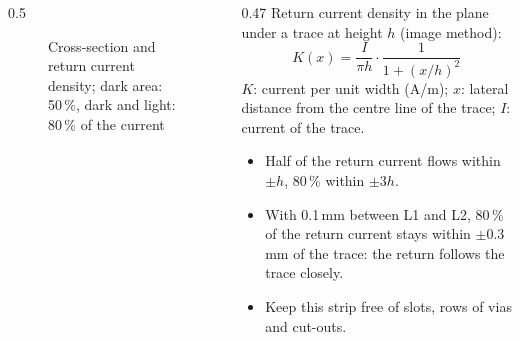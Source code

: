 \begin{frame}
\begin{columns}[T]
\begin{column}{0.5\textwidth}
\begin{figure}
				\caption{Cross-section and return current density; dark area: 50\,\%, dark and light: 80\,\% of the current}
			\end{figure}
		\end{column}
		\begin{column}{0.47\textwidth}
			\footnotesize
			Return current density in the plane under a trace at height $h$ (image method):
			\begin{equation*}
				K(x)=\frac{I}{\pi h}\cdot\frac{1}{1+(x/h)^2}
			\end{equation*}
			$K$: current per unit width (A/m); $x$: lateral distance from the centre line of the trace; $I$: current of the trace.
			\begin{itemize}
				\item Half of the return current flows within $\pm h$, 80\,\% within $\pm3h$.
				\item With 0.1\,mm between L1 and L2, 80\,\% of the return current stays within $\pm0.3$\,mm of the trace: the return follows the trace closely.
				\item Keep this strip free of slots, rows of vias and cut-outs.
			\end{itemize}
		\end{column}
	\end{columns}
\end{frame}

